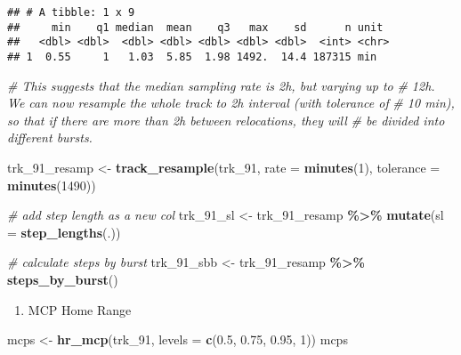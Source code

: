 \documentclass[
]{article}
\newenvironment{Shaded}{\begin{snugshade}}{\end{snugshade}}
\newcommand{\AttributeTok}[1]{\textcolor[rgb]{0.13,0.29,0.53}{#1}}
\newcommand{\CommentTok}[1]{\textcolor[rgb]{0.56,0.35,0.01}{\textit{#1}}}
\newcommand{\DecValTok}[1]{\textcolor[rgb]{0.00,0.00,0.81}{#1}}
\newcommand{\FloatTok}[1]{\textcolor[rgb]{0.00,0.00,0.81}{#1}}
\newcommand{\FunctionTok}[1]{\textcolor[rgb]{0.13,0.29,0.53}{\textbf{#1}}}
\newcommand{\NormalTok}[1]{#1}
\newcommand{\OtherTok}[1]{\textcolor[rgb]{0.56,0.35,0.01}{#1}}
\newcommand{\SpecialCharTok}[1]{\textcolor[rgb]{0.81,0.36,0.00}{\textbf{#1}}}
\providecommand{\tightlist}{%
  \setlength{\itemsep}{0pt}\setlength{\parskip}{0pt}}
\begin{document}
\begin{verbatim}
## # A tibble: 1 x 9
##     min    q1 median  mean    q3   max    sd      n unit 
##   <dbl> <dbl>  <dbl> <dbl> <dbl> <dbl> <dbl>  <int> <chr>
## 1  0.55     1   1.03  5.85  1.98 1492.  14.4 187315 min
\end{verbatim}

\begin{Shaded}
\begin{Highlighting}[]
\CommentTok{\# This suggests that the median sampling rate is 2h, but varying up to}
\CommentTok{\# 12h. We can now resample the whole track to 2h interval (with tolerance of}
\CommentTok{\# 10 min), so that if there are more than 2h between relocations, they will }
\CommentTok{\# be divided into different bursts.}

\NormalTok{trk\_91\_resamp }\OtherTok{\textless{}{-}} \FunctionTok{track\_resample}\NormalTok{(trk\_91, }\AttributeTok{rate =} \FunctionTok{minutes}\NormalTok{(}\DecValTok{1}\NormalTok{), }\AttributeTok{tolerance =} \FunctionTok{minutes}\NormalTok{(}\DecValTok{1490}\NormalTok{))}

\CommentTok{\# add step length as a new col}
\NormalTok{trk\_91\_sl }\OtherTok{\textless{}{-}}\NormalTok{ trk\_91\_resamp }\SpecialCharTok{\%\textgreater{}\%} \FunctionTok{mutate}\NormalTok{(}\AttributeTok{sl =} \FunctionTok{step\_lengths}\NormalTok{(.)) }

\CommentTok{\# calculate steps by burst}
\NormalTok{trk\_91\_sbb }\OtherTok{\textless{}{-}}\NormalTok{ trk\_91\_resamp }\SpecialCharTok{\%\textgreater{}\%} \FunctionTok{steps\_by\_burst}\NormalTok{()}
\end{Highlighting}
\end{Shaded}

\begin{enumerate}
\def\labelenumi{\alph{enumi}.}
\tightlist
\item
  MCP Home Range
\end{enumerate}

\begin{Shaded}
\begin{Highlighting}[]
\NormalTok{mcps }\OtherTok{\textless{}{-}} \FunctionTok{hr\_mcp}\NormalTok{(trk\_91, }\AttributeTok{levels =} \FunctionTok{c}\NormalTok{(}\FloatTok{0.5}\NormalTok{, }\FloatTok{0.75}\NormalTok{, }\FloatTok{0.95}\NormalTok{, }\DecValTok{1}\NormalTok{))}
\NormalTok{mcps}
\end{Highlighting}
\end{Shaded}
\end{document}
